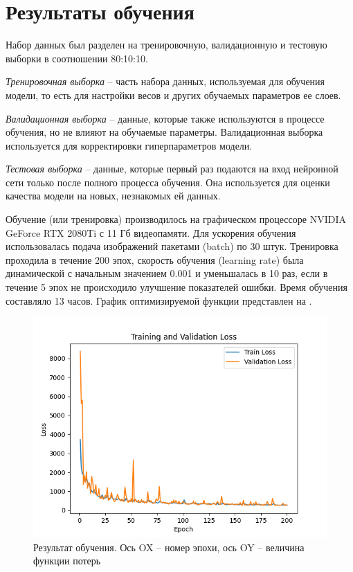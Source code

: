 \section{Результаты обучения} \label{ch3:sec2}
Набор данных был разделен на тренировочную, валидационную и тестовую выборки в соотношении 80:10:10.

\textit{Тренировочная выборка} -- часть набора данных, используемая для обучения модели, то есть для настройки весов и других обучаемых параметров ее слоев.

\textit{Валидационная выборка} -- данные, которые также используются в процессе обучения, но не влияют на обучаемые параметры. Валидационная выборка используется для корректировки гиперпараметров модели.

\textit{Тестовая выборка} -- данные, которые первый раз подаются на вход нейронной сети только после полного процесса обучения. Она используется для оценки качества модели на новых, незнакомых ей данных.

Обучение (или тренировка) производилось на графическом процессоре NVIDIA GeForce RTX 2080Ti с 11 Гб видеопамяти. Для ускорения обучения использовалась подача изображений пакетами (batch) по 30 штук. Тренировка проходила в течение 200 эпох, скорость обучения (learning rate) была динамической с начальным значением 0.001 и уменьшалась в 10 раз, если в течение 5 эпох не происходило улучшение показателей ошибки. Время обучения составляло 13 часов. График оптимизируемой функции представлен на . 

\begin{figure}[ht] 
	\center
	\includegraphics [scale=1.0] {my_folder/images/losses_200_epochs.png}
	\caption{Результат обучения. Ось OX -- номер эпохи, ось OY -- величина функции потерь}
	\label{fig:loss}
\end{figure}

